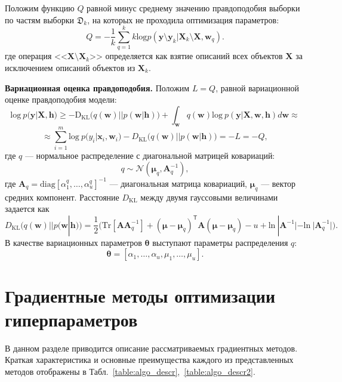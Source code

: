Положим функцию $Q$ равной минус среднему значению правдоподобия выборки по частям выборки $\mathfrak{D}_k$, на которых не проходила оптимизация параметров:
\[
Q = -\frac{1}{k}\sum_{q=1}^k k\text{log}p(\mathbf{y} \setminus \mathbf{y}_k|\mathbf{X}_k \setminus \mathbf{X}, \mathbf{w}_q).
\]
где операция <<$\mathbf{X} \setminus \mathbf{X}_k$>> определяется как взятие описаний всех объектов $\mathbf{X}$ за исключением описаний объектов из $\mathbf{X}_k$.


\textbf{Вариационная оценка правдоподобия. }
Положим $L=Q$, равной вариационной оценке правдоподобия модели:
\begin{equation} 
\text{log}~p(\mathbf{y}|\mathbf{X},\mathbf{h})  
\geq 
-\text{D}_\text{KL} \bigl(q(\mathbf{w})||p(\mathbf{w}|\mathbf{h})\bigr) + \int_{\mathbf{w}} q(\mathbf{w})\text{log}~{p(\mathbf{y}|\mathbf{X},\mathbf{w},\mathbf{h})} d \mathbf{w}  \approx
\label{eq:hyper_elbo}
\end{equation}
\[
\approx \sum_{i=1}^m \text{log}~p({y}_i|\mathbf{x}_i, \mathbf{w}_i) - D_\text{KL}\bigl(q (\mathbf{w}) || p (\mathbf{w}|\mathbf{h})\bigr) = -L = -Q,
\]
где $q$ --- нормальное распределение с диагональной матрицей ковариаций:
\begin{equation}
	q \sim \mathcal{N}(\boldsymbol{\mu}_q, \mathbf{A}^{-1}_q),
\label{eq:diag}
\end{equation}
где $\mathbf{A}_q = \text{diag}[\alpha^q_1, \dots, \alpha^q_u]^{-1}$ --- диагональная матрица ковариаций, $\boldsymbol{\mu}_q$ --- вектор средних компонент.
Расстояние $D_\text{KL}$ между двумя гауссовыми величинами задается как 
\[
	D_\text{KL}\bigl(q (\mathbf{w}) || p (\mathbf{w}|\mathbf{h})\bigr) = \frac{1}{2} \bigl( \text{Tr} [\mathbf{A}\mathbf{A}^{-1}_q] + (\boldsymbol{\mu} - \boldsymbol{\mu}_q)^\mathsf{T}\mathbf{A}(\boldsymbol{\mu} - \boldsymbol{\mu}_q) - u +\text{ln}~|\mathbf{A}^{-1}| - \text{ln}~|\mathbf{A}_q^{-1}| \bigr).
\]
В качестве вариационных параметров $\boldsymbol{\theta}$ выступают параметры распределения $q$:
\[
\boldsymbol{\theta} = [\alpha_1, \dots, \alpha_u, {\mu}_1,\dots,{\mu}_u].
\]




\section{Градиентные методы оптимизации гиперпараметров}
В данном разделе приводится описание рассматриваемых градиентных методов.
Краткая характеристика и основные преимущества каждого из представленных методов отображены в Табл.~\ref{table:algo_descr},~\ref{table:algo_descr2}.



